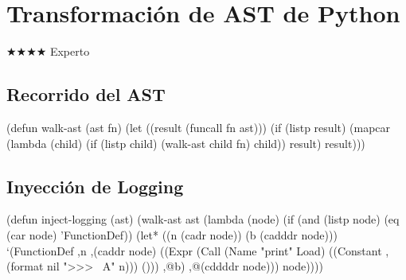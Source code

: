 \chapter{Transformación de AST de Python}
\label{chap:ast-transformation}
{\huge$\bigstar$}{\huge$\bigstar$}{\huge$\bigstar$}{\huge$\bigstar$} Experto

\section{Recorrido del AST}
\begin{lispcode}
(defun walk-ast (ast fn)
  (let ((result (funcall fn ast)))
    (if (listp result)
        (mapcar (lambda (child)
                  (if (listp child) (walk-ast child fn) child)) result)
        result)))
\end{lispcode}

\section{Inyección de Logging}
\begin{lispcode}
(defun inject-logging (ast)
  (walk-ast ast
    (lambda (node)
      (if (and (listp node) (eq (car node) 'FunctionDef))
          (let* ((n (cadr node)) (b (cadddr node)))
            `(FunctionDef ,n ,(caddr node)
              ((Expr (Call (Name "print" Load)
                         ((Constant ,(format nil ">>> ~A" n))) ()))
               ,@b) ,@(cddddr node)))
          node))))
\end{lispcode}

